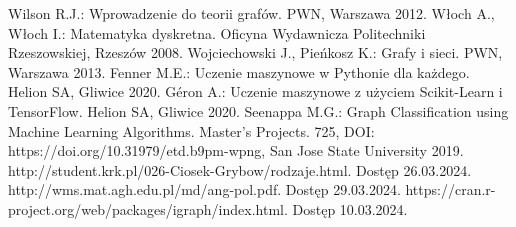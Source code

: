 
\begin{thebibliography}{4}
 Wilson R.J.: Wprowadzenie do teorii grafów. PWN, Warszawa 2012.
 Włoch A., Włoch I.: Matematyka dyskretna. Oficyna Wydawnicza Politechniki Rzeszowskiej, Rzeszów 2008.
 Wojciechowski J., Pieńkosz K.: Grafy i sieci. PWN, Warszawa 2013.
 Fenner M.E.: Uczenie maszynowe w Pythonie dla każdego. Helion SA, Gliwice 2020.
 Géron A.: Uczenie maszynowe z użyciem Scikit-Learn i TensorFlow. Helion SA, Gliwice 2020.
 Seenappa M.G.: Graph Classification using Machine Learning Algorithms. Master's Projects. 725, DOI: https://doi.org/10.31979/etd.b9pm-wpng, San Jose State University 2019.
 http://student.krk.pl/026-Ciosek-Grybow/rodzaje.html. Dostęp 26.03.2024.
 http://wms.mat.agh.edu.pl/\texttildelow md/ang-pol.pdf. Dostęp 29.03.2024. 
 https://cran.r-project.org/web/packages/igraph/index.html. Dostęp 10.03.2024.
\end{thebibliography}